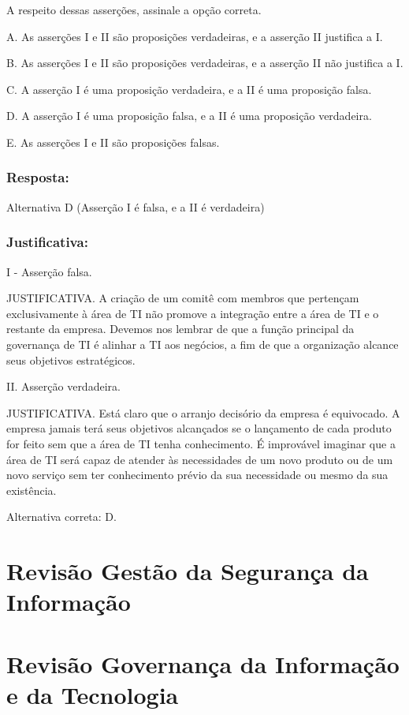 \documentclass[
]{book}
\begin{document}
A respeito dessas asserções, assinale a opção correta.

A. As asserções I e II são proposições verdadeiras, e a asserção II justifica a I.

B. As asserções I e II são proposições verdadeiras, e a asserção II não justifica a I.

C. A asserção I é uma proposição verdadeira, e a II é uma proposição falsa.

D. A asserção I é uma proposição falsa, e a II é uma proposição verdadeira.

E. As asserções I e II são proposições falsas.

\subsection{Resposta:}\label{resposta-2}

Alternativa D (Asserção I é falsa, e a II é verdadeira)

\subsection{Justificativa:}\label{justificativa-3}

I - Asserção falsa.

JUSTIFICATIVA. A criação de um comitê com membros que pertençam exclusivamente à área de TI não promove a integração entre a área de TI e o restante da empresa. Devemos nos lembrar de que a função principal da governança de TI é alinhar a TI aos negócios, a fim de que a organização alcance seus objetivos estratégicos.

II. Asserção verdadeira.

JUSTIFICATIVA. Está claro que o arranjo decisório da empresa é equivocado. A empresa jamais terá seus objetivos alcançados se o lançamento de cada produto for feito sem que a área de TI tenha conhecimento. É improvável imaginar que a área de TI será capaz de atender às necessidades de um novo produto ou de um novo serviço sem ter conhecimento prévio da sua necessidade ou mesmo da sua existência.

Alternativa correta: D.

\chapter{Revisão Gestão da Segurança da Informação}\label{revisuxe3o-gestuxe3o-da-seguranuxe7a-da-informauxe7uxe3o}

\chapter{Revisão Governança da Informação e da Tecnologia}\label{revisuxe3o-governanuxe7a-da-informauxe7uxe3o-e-da-tecnologia}
\end{document}
